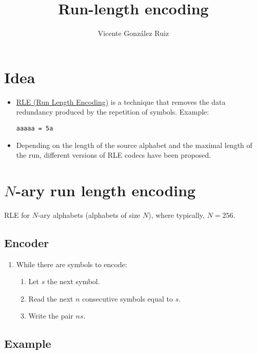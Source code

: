 \title{Run-length encoding}
\author{Vicente González Ruiz}
\maketitle
\tableofcontents

\section{Idea}
\begin{itemize}
\item \href{https://en.wikipedia.org/wiki/Run-length_encoding}{RLE (Run Length Encoding)} is a technique that removes the data redundancy produced by the repetition of symbols. Example:

\begin{verbatim}
aaaaa = 5a
\end{verbatim}

\item Depending on the length of the source alphabet and the maximal
  length of the run, different versions of RLE codecs have been
  proposed.
\end{itemize}

\section{$N$-ary run length encoding}

RLE for \(N\)-ary alphabets (alphabets of size \(N\)), where typically,
\(N=256\).

\subsection{Encoder}

\begin{enumerate}
\item While there are symbols to encode:
  \tightlist
  \begin{enumerate}
  \tightlist
  \item Let \(s\) the next symbol.
  \item Read the next \(n\) consecutive symbols equal to \(s\).
  \item Write the pair \(ns\).
  \end{enumerate}
\end{enumerate}

\subsection{Example}

